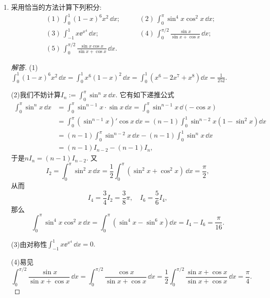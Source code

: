 \begin{quiza}
\begin{enumerate}
\begin{proof}[解答]
(5) 易见
\[\int_{0}^{\pi}\frac{x}{1+\sin^2x}\,\dd x
=\int_{0}^{\pi}\frac{\pi-x}{1+\sin^2x}\,\dd x
=\frac{\pi}{2}\int_{0}^{\pi}\frac{1}{1+\sin^2x}\,\dd x,\]
对于右侧的积分, 我们有\[\begin{split}
\int_{0}^{\pi}\frac{1}{1+\sin^2x}\,\dd x
&=2\int_{0}^{\pi/2}\frac{1}{1+\sin^2x}\,\dd x
=2\int_{0}^{\pi/2}\frac{\sec^2x}{2\tan^2x+1}\,\dd x\\
&=2\int_{0}^{+\infty}\frac{1}{2t^2+1}\,\dd t=\frac{\pi}{\sqrt{2}}.
\end{split}\]从而
\(\int_{0}^{\pi}\frac{x}{1+\sin^2 x}\,\dd x=\frac{\pi^2}{2\sqrt{2}}\).
\end{proof}

\item 采用恰当的方法计算下列积分:
\begin{align*}
&(1)\,\int_{0}^{1}(1-x)^6x^2\,\dd x;\qquad&(2)\,\int_{0}^{\pi}\sin^4x\cos^2x\,\dd x;\\
&(3)\,\int_{-1}^{1}x\ee^{x^4}\,\dd x;\qquad&(4)\,\int_{0}^{\pi/2}\frac{\sin x}{\sin x+\cos x}\,\dd x;\\
&(5)\,\int_{0}^{\pi/2}\frac{\sin x\cos x}{\sin x+\cos x}\,\dd x.&
\end{align*}

\begin{proof}[解答]
(1)\(\int_{0}^{1}(1-x)^6x^2\,\dd x=\int_{0}^{1}x^6(1-x)^2\,\dd x
=\int_{0}^{1}\left(x^6-2x^7+x^8\right)\dd x=\frac{1}{252}\).

(2)我们不妨计算\(I_n:=\int_0^\pi \sin^nx\,\dd x\). 它有如下递推公式\[\begin{split}
\int_0^\pi \sin^nx\,\dd x&=\int_{0}^{\pi}\sin^{n-1}x\cdot\sin x\,\dd x
=\int_{0}^{\pi}\sin^{n-1}x\,\dd(-\cos x)\\
&=\int_{0}^{\pi}\left(\sin^{n-1}x\right)'\cos x\,\dd x
=(n-1)\int_{0}^{1}\sin^{n-2}x\left(1-\sin^2x\right)\dd x\\
&=(n-1)\int_{0}^{\pi}\sin^{n-2}x\,\dd x-(n-1)\int_{0}^{1}\sin^nx\,\dd x\\
&=(n-1)I_{n-2}-(n-1)I_n,
\end{split}\]于是\(nI_n=(n-1)I_{n-2}\). 又
\[I_2=\int_{0}^{\pi}\sin^2x\,\dd x
=\frac{1}{2}\int_{0}^{\pi}(\sin^2x+\cos^2x)\,\dd x=\frac{\pi}{2},\]
从而\[I_4=\frac{3}{4}I_2=\frac{3}{8}\pi,\quad I_6=\frac{5}{6}I_4,\]
那么
\[\int_{0}^{\pi}\sin^4x\cos^2x\,\dd x
=\int_{0}^{\pi}\left(\sin^4x-\sin^6x\right)\dd x=I_4-I_6=\frac{\pi}{16}.\]

(3)由对称性\(\int_{-1}^{1}x\ee^{x^4}\,\dd x=0.\)

(4)易见\[\int_{0}^{\pi/2}\frac{\sin x}{\sin x+\cos x}\,\dd x
=\int_{0}^{\pi/2}\frac{\cos x}{\sin x+\cos x}\,\dd x
=\frac{1}{2}\int_{0}^{\pi/2}\frac{\sin x+\cos x}{\sin x+\cos x}\,\dd x
=\frac{\pi}{4}.\]


\end{proof}
\end{enumerate}
\end{quiza}
